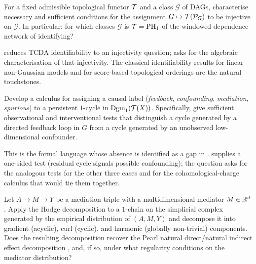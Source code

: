 \begin{question}
\label{q:tcda-identifiability}
For a fixed admissible topological functor $\mathcal{T}$ and a class
$\mathcal{G}$ of DAGs, characterise necessary and sufficient
conditions for the assignment $G \mapsto \mathcal{T}(\mathcal{P}_G)$ to be
injective on $\mathcal{G}$. In particular: for which classes
$\mathcal{G}$ is $\mathcal{T} = \mathrm{PH}_{1}$ of the windowed dependence network of
\citet{elyaagoubi2023statistical} identifying?
\end{question}

 reduces TCDA identifiability to an
injectivity question;  asks for the
algebraic characterisation of that injectivity. The classical
identifiability results for linear non-Gaussian models
\citep{shimizu2006lingam} and for score-based topological orderings
\citep{rolland2022score,tran2024constraining,xu2025information,
nocurl2024,wu2026optimization} are the natural touchstones.

\begin{question}
\label{q:cycle-semantics}
Develop a calculus for assigning a causal label
(\emph{feedback}, \emph{confounding}, \emph{mediation}, \emph{spurious})
to a persistent $1$-cycle in $\mathrm{Dgm}_{1}(\mathcal{T}(X))$. Specifically, give
sufficient observational and interventional tests that distinguish a
cycle generated by a directed feedback loop in $G$ from a cycle
generated by an unobserved low-dimensional confounder.
\end{question}

This is the formal language whose absence is identified as a gap in
.  supplies a
one-sided test (residual cycle signals possible confounding); the
question asks for the analogous tests for the other three cases and
for the cohomological-charge calculus that would tie them together.

\begin{question}
\label{q:cohomology-mediation}
Let $A \to M \to Y$ be a mediation triple with a multidimensional
mediator $M \in \mathbb{R}^d$. Apply the Hodge decomposition
\citep{desilva2007coverage,nocurl2024} to a $1$-chain on the simplicial
complex generated by the empirical distribution of $(A, M, Y)$ and
decompose it into gradient (acyclic), curl (cyclic), and harmonic
(globally non-trivial) components. Does the resulting decomposition
recover the Pearl natural direct/natural indirect effect decomposition
\citep{pearl2009causality}, and, if so, under what regularity
conditions on the mediator distribution?
\end{question}

